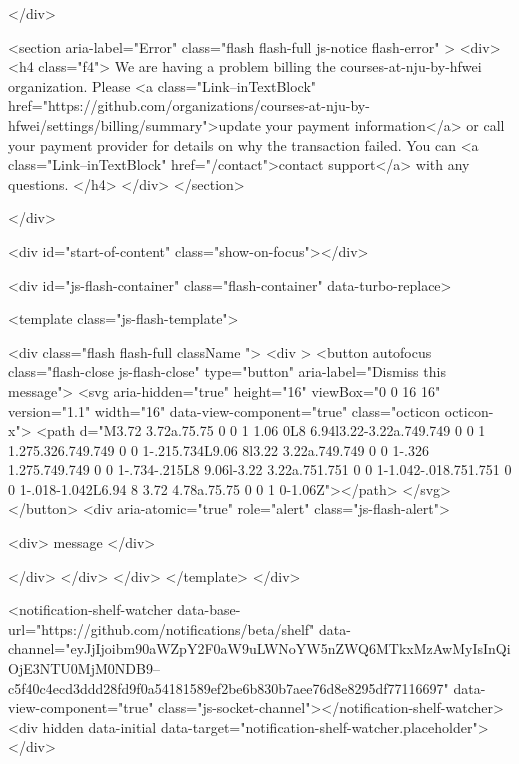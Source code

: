 {{  
</div>
        
          
                <section aria-label="Error" class="flash flash-full js-notice flash-error" >
    <div>
            <h4 class="f4">
              We are having a problem billing the courses-at-nju-by-hfwei organization.
              Please <a class="Link--inTextBlock" href="https://github.com/organizations/courses-at-nju-by-hfwei/settings/billing/summary">update your payment information</a>
              or call your payment provider for details on why the transaction failed.
              You can <a class="Link--inTextBlock" href="/contact">contact support</a> with any questions.
            </h4>
    </div>
  </section>

    </div>

  <div id="start-of-content" class="show-on-focus"></div>








    <div id="js-flash-container" class="flash-container" data-turbo-replace>




  <template class="js-flash-template">
    
<div class="flash flash-full   {{ className }}">
  <div >
    <button autofocus class="flash-close js-flash-close" type="button" aria-label="Dismiss this message">
      <svg aria-hidden="true" height="16" viewBox="0 0 16 16" version="1.1" width="16" data-view-component="true" class="octicon octicon-x">
    <path d="M3.72 3.72a.75.75 0 0 1 1.06 0L8 6.94l3.22-3.22a.749.749 0 0 1 1.275.326.749.749 0 0 1-.215.734L9.06 8l3.22 3.22a.749.749 0 0 1-.326 1.275.749.749 0 0 1-.734-.215L8 9.06l-3.22 3.22a.751.751 0 0 1-1.042-.018.751.751 0 0 1-.018-1.042L6.94 8 3.72 4.78a.75.75 0 0 1 0-1.06Z"></path>
</svg>
    </button>
    <div aria-atomic="true" role="alert" class="js-flash-alert">
      
      <div>{{ message }}</div>

    </div>
  </div>
</div>
  </template>
</div>


    
  <notification-shelf-watcher data-base-url="https://github.com/notifications/beta/shelf" data-channel="eyJjIjoibm90aWZpY2F0aW9uLWNoYW5nZWQ6MTkxMzAwMyIsInQiOjE3NTU0MjM0NDB9--c5f40c4ecd3ddd28fd9f0a54181589ef2be6b830b7aee76d8e8295df77116697" data-view-component="true" class="js-socket-channel"></notification-shelf-watcher>
  <div hidden data-initial data-target="notification-shelf-watcher.placeholder"></div>






}}
